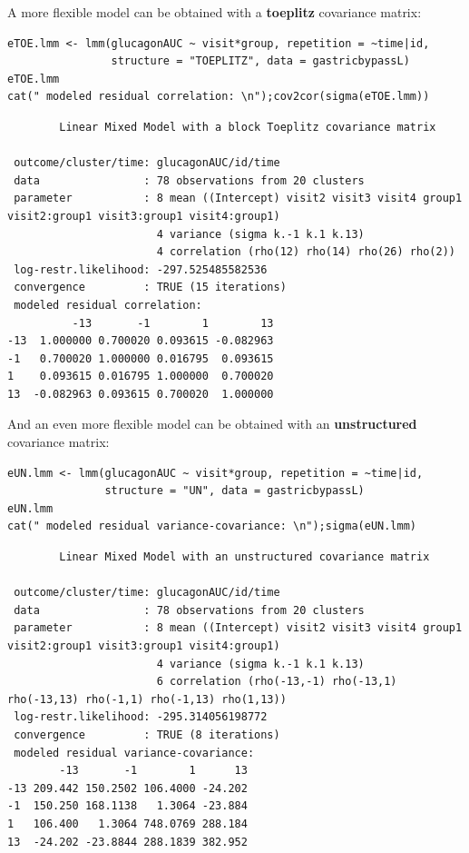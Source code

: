 \documentclass[12pt]{article}
\begin{document}
\noindent A more flexible model can be obtained with a \textbf{toeplitz} covariance matrix:
\lstset{language=r,label= ,caption= ,captionpos=b,numbers=none}
\begin{lstlisting}
eTOE.lmm <- lmm(glucagonAUC ~ visit*group, repetition = ~time|id,
                structure = "TOEPLITZ", data = gastricbypassL)
eTOE.lmm
cat(" modeled residual correlation: \n");cov2cor(sigma(eTOE.lmm))
\end{lstlisting}

\begin{verbatim}
		Linear Mixed Model with a block Toeplitz covariance matrix 

 outcome/cluster/time: glucagonAUC/id/time 
 data                : 78 observations from 20 clusters 
 parameter           : 8 mean ((Intercept) visit2 visit3 visit4 group1 visit2:group1 visit3:group1 visit4:group1) 
                       4 variance (sigma k.-1 k.1 k.13) 
                       4 correlation (rho(12) rho(14) rho(26) rho(2)) 
 log-restr.likelihood: -297.525485582536 
 convergence         : TRUE (15 iterations)
 modeled residual correlation: 
          -13       -1        1        13
-13  1.000000 0.700020 0.093615 -0.082963
-1   0.700020 1.000000 0.016795  0.093615
1    0.093615 0.016795 1.000000  0.700020
13  -0.082963 0.093615 0.700020  1.000000
\end{verbatim}

\clearpage

\noindent And an even more flexible model can be obtained with an
\textbf{unstructured} covariance matrix:

\lstset{language=r,label= ,caption= ,captionpos=b,numbers=none}
\begin{lstlisting}
eUN.lmm <- lmm(glucagonAUC ~ visit*group, repetition = ~time|id,
               structure = "UN", data = gastricbypassL)
eUN.lmm
cat(" modeled residual variance-covariance: \n");sigma(eUN.lmm)
\end{lstlisting}

\begin{verbatim}
		Linear Mixed Model with an unstructured covariance matrix 

 outcome/cluster/time: glucagonAUC/id/time 
 data                : 78 observations from 20 clusters 
 parameter           : 8 mean ((Intercept) visit2 visit3 visit4 group1 visit2:group1 visit3:group1 visit4:group1) 
                       4 variance (sigma k.-1 k.1 k.13) 
                       6 correlation (rho(-13,-1) rho(-13,1) rho(-13,13) rho(-1,1) rho(-1,13) rho(1,13)) 
 log-restr.likelihood: -295.314056198772 
 convergence         : TRUE (8 iterations)
 modeled residual variance-covariance: 
        -13       -1        1      13
-13 209.442 150.2502 106.4000 -24.202
-1  150.250 168.1138   1.3064 -23.884
1   106.400   1.3064 748.0769 288.184
13  -24.202 -23.8844 288.1839 382.952
\end{verbatim}
\end{document}
